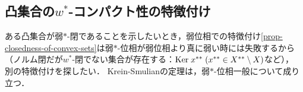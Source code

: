 \documentclass[uplatex,dvipdfmx]{jsreport}
\begin{document}
\subsection{凸集合の$w^*$-コンパクト性の特徴付け}

\begin{tcolorbox}[colframe=ForestGreen, colback=ForestGreen!10!white,breakable,colbacktitle=ForestGreen!40!white,coltitle=black,fonttitle=\bfseries\sffamily,
title=$w^*$-閉性の特徴付けは，単位閉球の言葉によってなされる．]
    ある凸集合が弱$*$-閉であることを示したいとき，弱位相での特徴付け\ref{prop-closedness-of-convex-sets}は弱$*$-位相が弱位相より真に弱い時には失敗するから（ノルム閉だが$w^*$-閉でない集合が存在する：$\mathrm{Ker}\; x^{**}\;(x^{**}\in X^{**}\setminus X)$など），
    別の特徴付けを探したい．
    Krein-Smulianの定理は，弱$*$-位相一般について成り立つ．
\end{tcolorbox}
\end{document}
